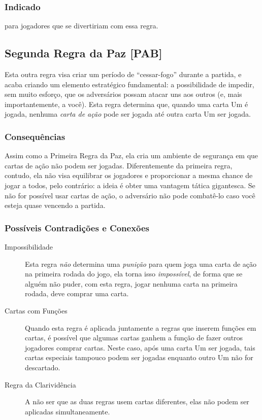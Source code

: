 \subsubsection{Indicado}

para jogadores que se divertiriam com essa regra.

\subsection{Segunda Regra da Paz [PAB]}

Esta outra regra visa criar um período de ``cessar-fogo'' durante a partida, e acaba criando um elemento estratégico fundamental: a possibilidade de impedir, sem muito esforço, que os adversários possam atacar uns aos outros (e, mais importantemente, a você). Esta regra determina que, quando uma carta Um é jogada, nenhuma \emph{carta de ação} pode ser jogada até outra carta Um ser jogada.

\subsubsection{Consequências}

Assim como a Primeira Regra da Paz, ela cria um ambiente de segurança em que cartas de ação não podem ser jogadas. Diferentemente da primeira regra, contudo, ela não visa equilibrar os jogadores e proporcionar a mesma chance de jogar a todos, pelo contrário: a ideia é obter uma vantagem tática gigantesca. Se não for possível usar cartas de ação, o adversário não pode combatê-lo caso você esteja quase vencendo a partida.

\subsubsection{Possíveis Contradições e Conexões}

\begin{description}
\item[Impossibilidade]{Esta regra \emph{não} determina uma \emph{punição} para quem joga uma carta de ação na primeira rodada do jogo, ela torna isso \emph{impossível}, de forma que se alguém não puder, com esta regra, jogar nenhuma carta na primeira rodada, deve comprar uma carta.}
\item[Cartas com Funções]{Quando esta regra é aplicada juntamente a regras que inserem funções em cartas, é possível que algumas cartas ganhem a função de fazer outros jogadores comprar cartas. Neste caso, após uma carta Um ser jogada, tais cartas especiais tampouco podem ser jogadas enquanto outro Um não for descartado.}
\item[Regra da Clarividência]{A não ser que as duas regras usem cartas diferentes, elas não podem ser aplicadas simultaneamente.}
\end{description}

